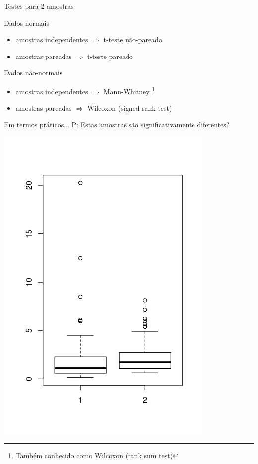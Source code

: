 \documentclass{beamer}
\begin{document}
\begin{frame}{Testes para 2 amostras}
  \begin{block}{Dados normais}
    \begin{itemize}
    \item amostras independentes $\Rightarrow$ t-teste não-pareado
    \item amostras pareadas $\Rightarrow$ t-teste pareado
    \end{itemize}
  \end{block}
  \begin{block}{Dados não-normais}
    \begin{itemize}
    \item amostras independentes $\Rightarrow$ \alert{Mann-Whitney} \footnote{Também conhecido como Wilcoxon (rank sum test)}
    \item amostras pareadas $\Rightarrow$ Wilcoxon (signed rank test)
    \end{itemize}
  \end{block}
\end{frame}

\begin{frame}{Em termos práticos...}
P: Estas amostras são significativamente diferentes?

  \centering
  \includegraphics[height=\textheight]{Nao_Param/2samples-bp}
\end{frame}
\end{document}
